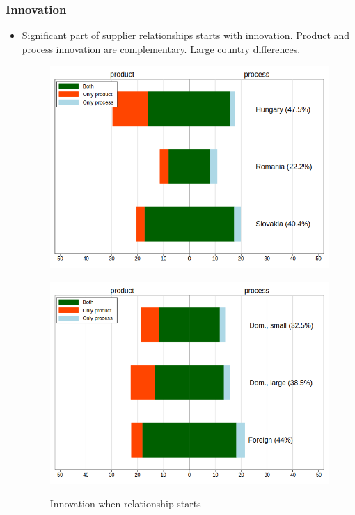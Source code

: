 \documentclass[final, dvipsnames, authoryear,12pt]{elsarticle}
\begin{document}

\subsubsection{Innovation}

\begin{itemize}
    \item Significant part of supplier relationships starts with innovation. Product and process innovation are complementary. Large country differences.
  

    
 \begin{figure}[h]    
    \begin{center}
    \label{fig:inn}    
    \caption{Innovation when relationship starts}  
     \label{fig:innov}
    \begin{subfloat}[By country]
    {\includegraphics[scale=0.5]{graphs/Fig7a.png}}
    \end{subfloat}
    \begin{subfloat}
    {\includegraphics[scale=0.5]{graphs/Fig7b.png}}

\end{subfloat}
\end{center}
\end{figure}
\end{itemize}
\end{document}
